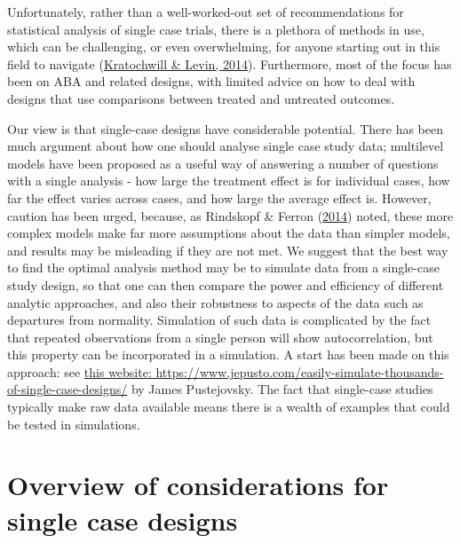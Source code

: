 \documentclass{krantz}
\begin{document}
Unfortunately, rather than a well-worked-out set of recommendations for statistical analysis of single case trials, there is a plethora of methods in use, which can be challenging, or even overwhelming, for anyone starting out in this field to navigate (\protect\hyperlink{ref-kratochwill2014c}{Kratochwill \& Levin, 2014}). Furthermore, most of the focus has been on ABA and related designs, with limited advice on how to deal with designs that use comparisons between treated and untreated outcomes.

Our view is that single-case designs have considerable potential. There has been much argument about how one should analyse single case study data; multilevel models have been proposed as a useful way of answering a number of questions with a single analysis - how large the treatment effect is for individual cases, how far the effect varies across cases, and how large the average effect is. However, caution has been urged, because, as Rindskopf \& Ferron (\protect\hyperlink{ref-rindskopf2014}{2014}) noted, these more complex models make far more assumptions about the data than simpler models, and results may be misleading if they are not met. We suggest that the best way to find the optimal analysis method may be to simulate data from a single-case study design, so that one can then compare the power and efficiency of different analytic approaches, and also their robustness to aspects of the data such as departures from normality. Simulation of such data is complicated by the fact that repeated observations from a single person will show autocorrelation, but this property can be incorporated in a simulation. A start has been made on this approach: see \href{https://www.jepusto.com/easily-simulate-thousands-of-single-case-designs/}{this website: https://www.jepusto.com/easily-simulate-thousands-of-single-case-designs/} by James Pustejovsky. The fact that single-case studies typically make raw data available means there is a wealth of examples that could be tested in simulations.

\hypertarget{overview-of-considerations-for-single-case-designs}{%
\section{Overview of considerations for single case designs}\label{overview-of-considerations-for-single-case-designs}}
\end{document}
